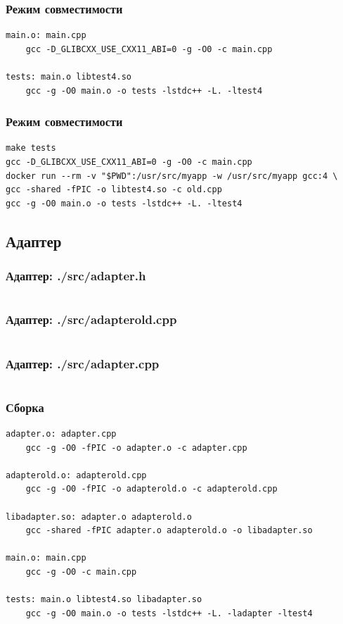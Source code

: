 \documentclass{beamer}
\begin{document}
\begin{frame}[fragile]
\frametitle{Режим совместимости}
\begin{verbatim}
main.o: main.cpp
	gcc -D_GLIBCXX_USE_CXX11_ABI=0 -g -O0 -c main.cpp

tests: main.o libtest4.so
	gcc -g -O0 main.o -o tests -lstdc++ -L. -ltest4
\end{verbatim}
\end{frame}

\begin{frame}[fragile]
\frametitle{Режим совместимости}
\begin{verbatim}
make tests
gcc -D_GLIBCXX_USE_CXX11_ABI=0 -g -O0 -c main.cpp 
docker run --rm -v "$PWD":/usr/src/myapp -w /usr/src/myapp gcc:4 \
gcc -shared -fPIC -o libtest4.so -c old.cpp
gcc -g -O0 main.o -o tests -lstdc++ -L. -ltest4
\end{verbatim}
\end{frame}

\subsection*{Адаптер}
\begin{frame}[fragile]
\frametitle{Адаптер: ./src/adapter.h}
\inputminted{c++}{../src/adapter.h}
\end{frame}

\begin{frame}[fragile]
\frametitle{Адаптер: ./src/adapterold.cpp}
\inputminted{c++}{../src/adapterold.cpp}
\end{frame}

\begin{frame}[fragile]
\frametitle{Адаптер: ./src/adapter.cpp}
\inputminted{c++}{../src/adapter.cpp}
\end{frame}

\begin{frame}[fragile]
\frametitle{Сборка}
\begin{verbatim}
adapter.o: adapter.cpp
	gcc -g -O0 -fPIC -o adapter.o -c adapter.cpp

adapterold.o: adapterold.cpp
	gcc -g -O0 -fPIC -o adapterold.o -c adapterold.cpp

libadapter.so: adapter.o adapterold.o
	gcc -shared -fPIC adapter.o adapterold.o -o libadapter.so 

main.o: main.cpp
	gcc -g -O0 -c main.cpp 

tests: main.o libtest4.so libadapter.so
	gcc -g -O0 main.o -o tests -lstdc++ -L. -ladapter -ltest4
\end{verbatim}
\end{frame}
\end{document}
